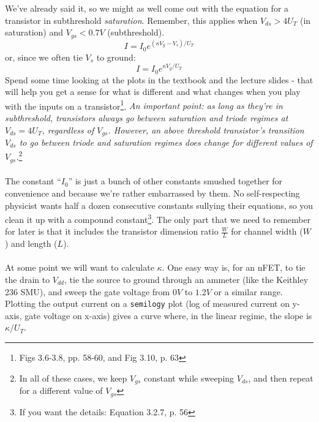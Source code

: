 We've already said it, so we might as well come out with the equation for a transistor in subthreshold \emph{saturation}. Remember, this applies when $V_{ds} > 4U_T$ (in saturation) and $V_{gs} < 0.7V$ (subthreshold).
\begin{equation}
I = I_0 e^{(\kappa V_g - V_s)/U_T} \label{subSatEqn}
\end{equation}
or, since we often tie $V_s$ to ground:
\begin{equation}
I = I_0 e^{\kappa V_g/U_T}
\end{equation}
Spend some time looking at the plots in the textbook and the lecture slides - that will help you get a sense for what is different and what changes when you play with the inputs on a transistor\footnote{Figs 3.6-3.8, pp. 58-60, and Fig 3.10, p. 63}. \textsl{An important point: as long as they're in \emph{subthreshold}, transistors always go between saturation and triode regimes at $V_{ds} = 4U_T$, regardless of $V_{gs}$. However, an \emph{above threshold} transistor's transition $V_{ds}$ to go between triode and saturation regimes \emph{does} change for different values of $V_{gs}$.}\footnote{In all of these cases, we keep $V_{gs}$ constant while sweeping $V_{ds}$, and then repeat for a different value of $V_{gs}$}\\ \\
The constant ``$I_0$'' is just a bunch of other constants smushed together for convenience and because we're rather embarrassed by them. No self-respecting physicist wants half a dozen consecutive constants sullying their equations, so you clean it up with a compound constant\footnote{If you want the details: Equation 3.2.7, p. 56}. The only part that we need to remember for later is that it includes the transistor dimension ratio $\frac{W}{L}$ for channel width ($W$) and length ($L$).\\ \\
At some point we will want to calculate $\kappa$. One easy way is, for an nFET, to tie the drain to $V_{dd}$, tie the source to ground through an ammeter (like the Keithley 236 SMU), and sweep the gate voltage from $0V$ to $1.2V$ or a similar range. Plotting the output current on a \texttt{semilogy} plot (log of measured current on y-axis, gate voltage on x-axis) gives a curve where, in the linear regime, the slope is $\kappa/U_T$.
